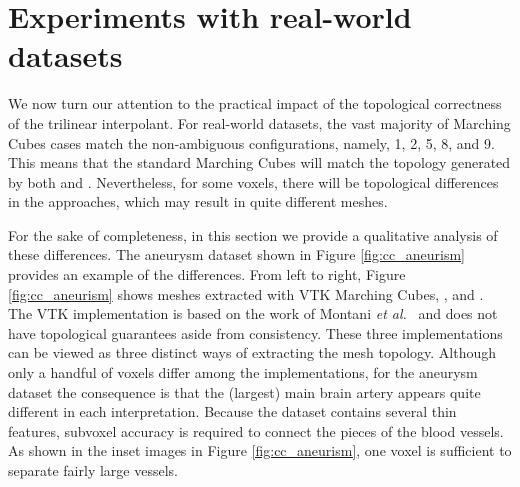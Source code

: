 \section{Experiments with real-world datasets}
\label{sec:real-world}

We now turn our attention to the practical impact of the topological correctness of the trilinear interpolant. 
For real-world datasets, the vast majority of Marching Cubes cases match the non-ambiguous configurations, namely, 1, 2, 5, 8, and 9. This means that the standard Marching Cubes will match the topology generated by both \mc{} and \cmc.
%
Nevertheless, for some voxels, there will be topological differences in the approaches, which may result in quite different meshes. 

For the sake of completeness, in this section we provide a qualitative analysis of these differences. The aneurysm dataset shown in Figure \ref{fig:cc_aneurism} provides an example of the differences. From left to right, Figure \ref{fig:cc_aneurism} shows meshes extracted with VTK Marching Cubes, \mc, and \cmc. The VTK implementation is based on the work of Montani \emph{et al.}~\cite{Montani:1994wp} and does not have topological guarantees aside from consistency. These three implementations can be viewed as three distinct ways of extracting the mesh topology.
%
Although only a handful of voxels differ among the implementations, for the aneurysm dataset the consequence is that the (largest) main brain artery appears quite different in each interpretation. Because the dataset contains several thin features, subvoxel accuracy is required to connect the pieces of the blood vessels. As shown in the inset images in Figure \ref{fig:cc_aneurism}, one voxel is sufficient to separate fairly large vessels.

